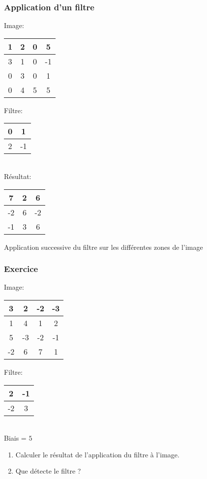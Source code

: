 \documentclass{formation}
\begin{document}
\begin{frame}
  \frametitle{Application d'un filtre}
  \begin{multicols}{2}
    Image:
    \begin{tabular}{|c|c|c|c|}
      \hline
      1 & 2 & 0 & 5 \\
      \hline
      3 & 1 & 0 & -1 \\
      \hline
      0 & 3 & \cellcolor{green}0 & \cellcolor{green}1 \\
      \hline
      0 & 4 & \cellcolor{green}5 & \cellcolor{green}5 \\
      \hline
    \end{tabular}

    \columnbreak

    Filtre:
    \begin{tabular}{|c|c|}
      \hline
      0 & 1  \\
      \hline
      2 & -1 \\
      \hline
    \end{tabular}\\[.5cm]
    Résultat:
    \begin{tabular}{|c|c|c|}
      \hline
      7 & 2 & 6\\
      \hline
      -2 & 6 & -2\\
      \hline
      -1 & 3 & 6\\
      \hline
    \end{tabular}
  \end{multicols}
  Application successive du filtre sur les différentes zones de l'image
\end{frame}

\begin{frame}
  \frametitle{Exercice}
  \begin{multicols}{2}
    Image:
    \begin{tabular}{|c|c|c|c|}
      \hline
      3 & 2 & -2 & -3 \\
      \hline
      1 & 4 & 1 & 2 \\
      \hline
      5 & -3 & -2 & -1 \\
      \hline
      -2 & 6 & 7 & 1 \\
      \hline
    \end{tabular}

    \columnbreak

    Filtre:
    \begin{tabular}{|c|c|}
      \hline
      2 & -1 \\
      \hline
      -2 & 3 \\
      \hline
    \end{tabular}\\[.5cm]
    Biais = $5$
  \end{multicols}
  \begin{enumerate}
  \item Calculer le résultat de l'application du filtre à l'image.
  \item Que détecte le filtre ?
  \end{enumerate}
\end{frame}
\end{document}
